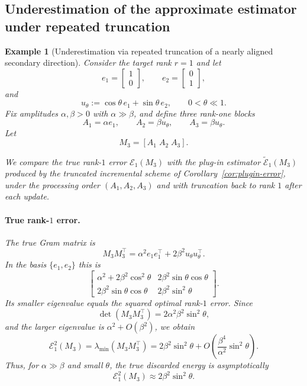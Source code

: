 \documentclass[10pt]{article} %
\def\1{\bm{1}}
\newtheorem{example}{Example}
\begin{document}
\subsection{Underestimation of the approximate estimator under repeated truncation}
\label{appendix:approx-negative-slack}

\begin{example}[Underestimation via repeated truncation of a nearly aligned secondary direction]
\label{ex:approx-negative-slack}
Consider the target rank $r=1$ and let
\[
e_1 = \begin{bmatrix}1\\0\end{bmatrix}, \qquad
e_2 = \begin{bmatrix}0\\1\end{bmatrix},
\]
and
\[
u_\theta := \cos\theta\, e_1 + \sin\theta\, e_2,
\qquad 0<\theta\ll 1.
\]
Fix amplitudes $\alpha,\beta>0$ with $\alpha \gg \beta$, and define three rank-one blocks
\[
A_1 = \alpha e_1, \qquad
A_2 = \beta u_\theta, \qquad
A_3 = \beta u_\theta.
\]
Let
\[
M_3 = [A_1\;A_2\;A_3].
\]

We compare the true rank-$1$ error $\mathcal{E}_1(M_3)$ with the plug-in estimator
$\widetilde{\mathcal{E}}_1(M_3)$ produced by the truncated incremental scheme of
Corollary~\ref{cor:plugin-error}, under the processing order $(A_1,A_2,A_3)$ and with
truncation back to rank $1$ after each update.

\paragraph{True rank-$1$ error.}
The true Gram matrix is
\[
M_3 M_3^\top
=
\alpha^2 e_1 e_1^\top + 2\beta^2 u_\theta u_\theta^\top.
\]
In the basis $\{e_1,e_2\}$ this is
\[
\begin{bmatrix}
\alpha^2 + 2\beta^2 \cos^2\theta & 2\beta^2 \sin\theta\cos\theta \\
2\beta^2 \sin\theta\cos\theta & 2\beta^2 \sin^2\theta
\end{bmatrix}.
\]
Its smaller eigenvalue equals the squared optimal rank-$1$ error. Since
\[
\det(M_3M_3^\top) = 2\alpha^2\beta^2 \sin^2\theta,
\]
and the larger eigenvalue is $\alpha^2 + O(\beta^2)$, we obtain
\[
\mathcal{E}_1^2(M_3)
=
\lambda_{\min}(M_3M_3^\top)
=
2\beta^2 \sin^2\theta + O\!\left(\frac{\beta^4}{\alpha^2}\sin^2\theta\right).
\]
Thus, for $\alpha\gg\beta$ and small $\theta$, the true discarded energy is asymptotically
\[
\mathcal{E}_1^2(M_3) \approx 2\beta^2\sin^2\theta.
\]


\end{example}
\end{document}
